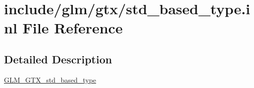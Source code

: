 \hypertarget{std__based__type_8inl}{}\section{include/glm/gtx/std\+\_\+based\+\_\+type.inl File Reference}
\label{std__based__type_8inl}


\subsection{Detailed Description}
\hyperlink{group__gtx__std__based__type}{G\+L\+M\+\_\+\+G\+T\+X\+\_\+std\+\_\+based\+\_\+type} 